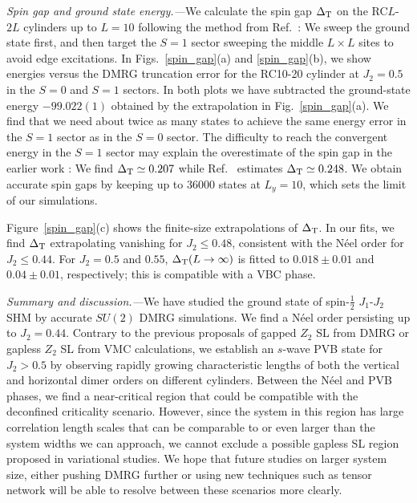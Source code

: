 \documentclass[prl,aps,epsf,showpacs,twocolumn]{revtex4}
\begin{document}
\textit{Spin gap and ground state energy.---}We calculate the spin gap $\Delta_{\rm T}$ on the RC$L$-$2L$ cylinders up to $L = 10$ following the method from Ref.~\cite{Science_332_1173}: We sweep the ground state first, and then target the $S=1$ sector sweeping the middle $L \times L$ sites to avoid edge excitations.
In Figs.~\ref{spin_gap}(a) and \ref{spin_gap}(b), we show energies versus the DMRG truncation error for the RC10-20 cylinder at $J_2 = 0.5$ in the $S=0$ and $S=1$ sectors. In both plots we have subtracted the ground-state energy $-99.022(1)$ obtained by the extrapolation in Fig.~\ref{spin_gap}(a).
We find that we need about twice as many states to achieve
the same energy error in the $S=1$ sector as in the $S=0$ sector.
The difficulty to reach the convergent energy in the $S=1$ sector may explain the overestimate of the spin gap in the earlier work \cite{PRB_86_024424}:  We find $\Delta_{\rm T} \simeq 0.207$ while Ref.~\cite{PRB_86_024424} estimates $\Delta_{\rm T} \simeq 0.248$.
We obtain accurate spin gaps by keeping up to $36000$ states at $L_y = 10$, which sets the limit of our simulations.

Figure~\ref{spin_gap}(c)  shows the finite-size extrapolations of $\Delta_{\rm T}$.
In our fits, we find $\Delta_{\rm T}$ extrapolating vanishing for $J_2 \leq 0.48$, consistent with the N\'{e}el order for $J_2 \leq 0.44$. For $J_2 = 0.5$ and $0.55$, $\Delta_{\rm T}(L\to \infty)$ is fitted to $0.018\pm 0.01$ and $0.04 \pm 0.01$, respectively; this is compatible with a VBC phase.


\textit{Summary and discussion.---}We have studied the ground state of spin-$\frac{1}{2}$ $J_1$-$J_2$ SHM by accurate $SU(2)$ DMRG simulations.  We find a N\'{e}el order persisting up to $J_2 = 0.44$.
Contrary to the previous proposals of gapped $Z_2$ SL from DMRG\cite{PRB_86_024424} or gapless $Z_2$ SL from VMC calculations\cite{PRB_88_060402}, we establish an $s$-wave PVB state for $J_2 > 0.5$ by observing
rapidly growing characteristic lengths of both the vertical and horizontal dimer orders on different cylinders.
Between the N\'{e}el and PVB phases, we find a near-critical region that could be compatible with the deconfined criticality scenario.
However, since the system in this region has large correlation length scales that can be comparable to or even larger than the system widths we can approach, we cannot exclude a possible gapless SL region proposed in variational studies\cite{PRL_111_037202,PRB_88_060402}.
We hope that future studies on larger system size, either pushing DMRG further or using new techniques such as tensor network will be able to resolve between these scenarios more clearly.
\end{document}
